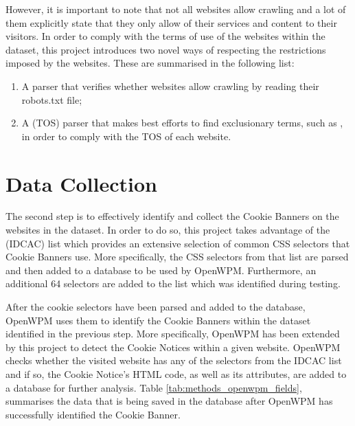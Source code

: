 \documentclass[../main.tex]{subfiles}
\begin{document}
However, it is important to note that not all websites allow crawling and a lot of them explicitly state that they only allow  of their services and content to their visitors. In order to comply with the terms of use of the websites within the dataset, this project introduces two novel ways of respecting the restrictions imposed by the websites. These are summarised in the following list:

\begin{enumerate}
    \item A  parser that verifies whether websites allow crawling by reading their robots.txt file;
    
    \item A  (TOS) parser that makes best efforts to find exclusionary terms, such as , in order to comply with the TOS of each website.
\end{enumerate}

\section{Data Collection}
The second step is to effectively identify and collect the Cookie Banners on the websites in the dataset. In order to do so, this project takes advantage of the  (IDCAC) list which provides an extensive selection of common CSS selectors that Cookie Banners use. More specifically, the CSS selectors from that list are parsed and then added to a database to be used by OpenWPM. Furthermore, an additional 64 selectors are added to the list which was identified during testing.

After the cookie selectors have been parsed and added to the database, OpenWPM uses them to identify the Cookie Banners within the dataset identified in the previous step. More specifically, OpenWPM has been extended by this project to detect the Cookie Notices within a given website. OpenWPM checks whether the visited website has any of the selectors from the IDCAC list and if so, the Cookie Notice’s HTML code, as well as its attributes, are added to a database for further analysis. Table \ref{tab:methods_openwpm_fields}, summarises the data that is being saved in the database after OpenWPM has successfully identified the Cookie Banner. 
\end{document}
